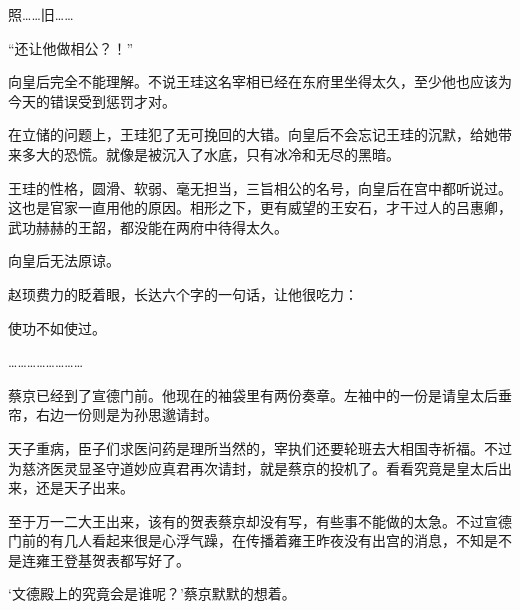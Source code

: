 照……旧……

“还让他做相公？！”

向皇后完全不能理解。不说王珪这名宰相已经在东府里坐得太久，至少他也应该为今天的错误受到惩罚才对。

在立储的问题上，王珪犯了无可挽回的大错。向皇后不会忘记王珪的沉默，给她带来多大的恐慌。就像是被沉入了水底，只有冰冷和无尽的黑暗。

王珪的性格，圆滑、软弱、毫无担当，三旨相公的名号，向皇后在宫中都听说过。这也是官家一直用他的原因。相形之下，更有威望的王安石，才干过人的吕惠卿，武功赫赫的王韶，都没能在两府中待得太久。

向皇后无法原谅。

赵顼费力的眨着眼，长达六个字的一句话，让他很吃力：

使功不如使过。

……………………

蔡京已经到了宣德门前。他现在的袖袋里有两份奏章。左袖中的一份是请皇太后垂帘，右边一份则是为孙思邈请封。

天子重病，臣子们求医问药是理所当然的，宰执们还要轮班去大相国寺祈福。不过为慈济医灵显圣守道妙应真君再次请封，就是蔡京的投机了。看看究竟是皇太后出来，还是天子出来。

至于万一二大王出来，该有的贺表蔡京却没有写，有些事不能做的太急。不过宣德门前的有几人看起来很是心浮气躁，在传播着雍王昨夜没有出宫的消息，不知是不是连雍王登基贺表都写好了。

‘文德殿上的究竟会是谁呢？’蔡京默默的想着。
